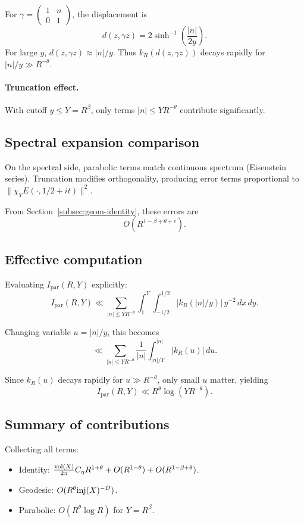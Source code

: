 For $\gamma=\begin{pmatrix}1&n\\0&1\end{pmatrix}$, the displacement is
\[
d(z,\gamma z)=2\sinh^{-1}\!\left(\frac{|n|}{2y}\right).
\]
For large $y$, $d(z,\gamma z)\approx |n|/y$. Thus $k_R(d(z,\gamma z))$ decays rapidly for $|n|/y\gg R^{-\theta}$.

\paragraph{Truncation effect.} With cutoff $y\le Y=R^\beta$, only terms $|n|\le YR^{-\theta}$ contribute significantly.

\subsection{Spectral expansion comparison}\label{subsec:geom-par-spectral}

On the spectral side, parabolic terms match continuous spectrum (Eisenstein series). Truncation modifies orthogonality, producing error terms proportional to $\|\chi_Y E(\cdot,1/2+it)\|^2$.

From Section~\ref{subsec:geom-identity}, these errors are
\[
O(R^{1-\beta+\theta+\epsilon}).
\]

\subsection{Effective computation}\label{subsec:geom-par-effective}

Evaluating $I_{\mathrm{par}}(R,Y)$ explicitly:
\[
I_{\mathrm{par}}(R,Y)\ll \sum_{|n|\le YR^{-\theta}} \int_1^Y \int_{-1/2}^{1/2} |k_R(|n|/y)|\,y^{-2}\,dx\,dy.
\]

Changing variable $u=|n|/y$, this becomes
\[
\ll \sum_{|n|\le YR^{-\theta}}\frac{1}{|n|}\int_{|n|/Y}^{|n|} |k_R(u)|\,du.
\]

Since $k_R(u)$ decays rapidly for $u\gg R^{-\theta}$, only small $u$ matter, yielding
\[
I_{\mathrm{par}}(R,Y)\ll R^\theta \log(YR^{-\theta}).
\]

\subsection{Summary of contributions}\label{subsec:geom-summary}

Collecting all terms:

\begin{itemize}
  \item Identity: $\frac{\operatorname{vol}(X)}{2\pi} C_\eta R^{1+\theta} + O(R^{1-\theta})+O(R^{1-\beta+\theta})$.
  \item Geodesic: $O(R^\theta\mathrm{inj}(X)^{-D})$.
  \item Parabolic: $O(R^\theta\log R)$ for $Y=R^\beta$.
\end{itemize}

